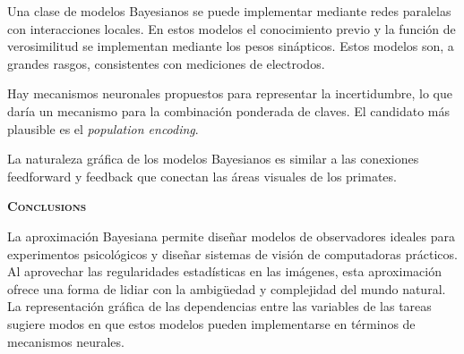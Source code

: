 \documentclass[a4paper,12pt]{article}
\begin{document}
Una clase de modelos Bayesianos se puede implementar mediante redes paralelas con interacciones locales. En estos modelos el conocimiento previo y la función de verosimilitud se implementan mediante los pesos sinápticos. Estos modelos son, a grandes rasgos, consistentes con mediciones de electrodos.

Hay mecanismos neuronales propuestos para representar la incertidumbre, lo que daría un mecanismo para la combinación ponderada de claves. El candidato más plausible es el {\itshape population encoding}.

La naturaleza gráfica de los modelos Bayesianos es similar a las conexiones feedforward y feedback que conectan las áreas visuales de los primates.

{\scshape\bfseries Conclusions}

La aproximación Bayesiana permite diseñar modelos de observadores ideales para experimentos psicológicos y diseñar sistemas de visión de computadoras prácticos. Al aprovechar las regularidades estadísticas en las imágenes, esta aproximación ofrece una forma de lidiar con la ambigüedad y complejidad del mundo natural. La representación gráfica de las dependencias entre las variables de las tareas sugiere modos en que estos modelos pueden implementarse en términos de mecanismos neurales.
\end{document}
